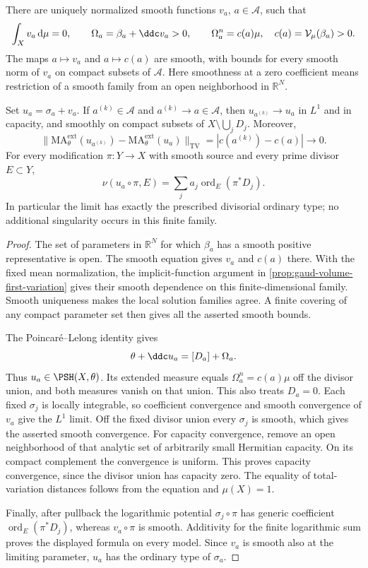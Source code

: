 \begin{proposition}\label{prop:finite-divisorial-equation-limits}
There are uniquely normalized smooth functions $v_a$, $a\in\mathcal A$, such that
\[
 \int_Xv_a\,\mathrm{d}\mu=0,\qquad
 \Omega_a=\beta_a+\ddc v_a>0,\qquad
 \Omega_a^n=c(a)\mu,
 \quad c(a)=\mathcal V_\mu(\beta_a)>0.
\]
The maps $a\mapsto v_a$ and $a\mapsto c(a)$ are smooth, with bounds for every smooth norm of $v_a$ on compact subsets of $\mathcal A$. Here smoothness at a zero coefficient means restriction of a smooth family from an open neighborhood in $\mathbb R^N$.

Set $u_a=\sigma_a+v_a$. If $a^{(k)}\in\mathcal A$ and $a^{(k)}\to a\in\mathcal A$, then $u_{a^{(k)}}\to u_a$ in $L^1$ and in capacity, and smoothly on compact subsets of $X\setminus\bigcup_jD_j$. Moreover,
\[
 \bigl\|\mathrm{MA}^{\mathrm{ext}}_\theta(u_{a^{(k)}})
       -\mathrm{MA}^{\mathrm{ext}}_\theta(u_a)\bigr\|_{\mathrm{TV}}
       =|c(a^{(k)})-c(a)|\longrightarrow0.
\]
For every modification $\pi:Y\to X$ with smooth source and every prime divisor $E\subset Y$,
\[
 \nu(u_a\circ\pi,E)=\sum_j a_j\operatorname{ord}_E(\pi^*D_j).
\]
In particular the limit has exactly the prescribed divisorial ordinary type; no additional singularity occurs in this finite family.
\end{proposition}
\begin{proof}
The set of parameters in $\mathbb R^N$ for which $\beta_a$ has a smooth positive representative is open. The smooth equation gives $v_a$ and $c(a)$ there. With the fixed mean normalization, the implicit-function argument in \cref{prop:gaud-volume-first-variation} gives their smooth dependence on this finite-dimensional family. Smooth uniqueness makes the local solution families agree. A finite covering of any compact parameter set then gives all the asserted smooth bounds.

The Poincar\'e--Lelong identity gives
\[
 \theta+\ddc u_a=[D_a]+\Omega_a.
\]
Thus $u_a\in\PSH(X,\theta)$. Its extended measure equals $\Omega_a^n=c(a)\mu$ off the divisor union, and both measures vanish on that union. This also treats $D_a=0$. Each fixed $\sigma_j$ is locally integrable, so coefficient convergence and smooth convergence of $v_a$ give the $L^1$ limit. Off the fixed divisor union every $\sigma_j$ is smooth, which gives the asserted smooth convergence. For capacity convergence, remove an open neighborhood of that analytic set of arbitrarily small Hermitian capacity. On its compact complement the convergence is uniform. This proves capacity convergence, since the divisor union has capacity zero. The equality of total-variation distances follows from the equation and $\mu(X)=1$.

Finally, after pullback the logarithmic potential $\sigma_j\circ\pi$ has generic coefficient $\operatorname{ord}_E(\pi^*D_j)$, whereas $v_a\circ\pi$ is smooth. Additivity for the finite logarithmic sum proves the displayed formula on every model. Since $v_a$ is smooth also at the limiting parameter, $u_a$ has the ordinary type of $\sigma_a$.
\end{proof}

